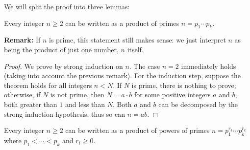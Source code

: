 \documentclass[11pt,dvipsnames]{book}
\numberwithin{figure}{section} %
\numberwithin{table}{section} %
\begin{document}
%
%
%
%
%
%
%

We will split the proof into three lemmas:

\begin{lemma}
Every integer $n\geq 2$ can be written as a product of primes $n=p_{1}\cdots p_{k}$.
\end{lemma}

{\bf Remark:} If $n$ is prime, this statement still makes sense: we just interpret $n$ as being the product of just one number, $n$ itself.

\begin{proof}
We prove by strong induction on $n$. The case $n=2$ immediately holds (taking into account the previous remark). For the induction step, suppose the theorem holds for all integers $n<N$.  If $N$ is prime, there is nothing to prove; otherwise, if $N$ is not prime, then $N=a\cdot b$ for some positive integers $a$ and $b$, both greater than $1$ and less than $N$. Both $a$ and $b$ can be  decomposed by the strong induction hypothesis, thus so can $n=ab$.
\end{proof}

\begin{lemma}
Every integer $n\geq 2$ can be written as a product of powers of primes $n=p_{1}^{r_{1}}\cdots p_{k}^{r_{k}}$ where $p_{1}<\cdots < p_{k}$ and $r_{i}\geq 0$.
\end{lemma}
\end{document}
